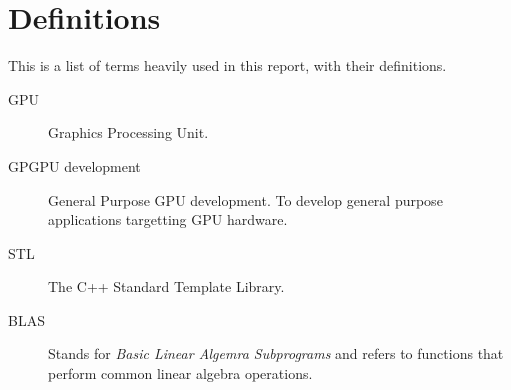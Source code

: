 \section*{Definitions}
This is a list of terms heavily used in this report, with their definitions.

\begin{description}
\item[GPU] Graphics Processing Unit.
\item[GPGPU development] General Purpose GPU development. To develop general purpose applications targetting GPU hardware.
\item[STL] The C++ Standard Template Library.
\item[BLAS] Stands for \textit{Basic Linear Algemra Subprograms} and refers to functions that perform common linear algebra operations.
\end{description}
